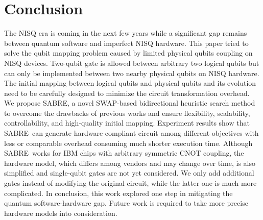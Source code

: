 \documentclass[journal,10pt,twocolumn]{IEEEtran}
\newcommand{\myalgorithmname}{SABRE}
\begin{document}
\section{Conclusion}\label{sec:conclusion}

The NISQ era is coming in the next few years while a significant gap remains between quantum software and imperfect NISQ hardware.
This paper tried to solve the qubit mapping problem caused by limited physical qubits coupling on NISQ devices.
Two-qubit gate is allowed between arbitrary two logical qubits but can only be implemented between two nearby physical qubits on NISQ hardware.
The initial mapping between logical qubits and physical qubits and its evolution need to be carefully designed to minimize the circuit transformation overhead. 
We propose \myalgorithmname, a novel SWAP-based bidirectional heuristic search method to overcome the drawbacks of previous works and ensure flexibility, scalability, controllability, and high-quality initial mapping. 
Experiment results show that \myalgorithmname~can generate hardware-compliant circuit among different objectives with less or comparable overhead consuming much shorter execution time.
Although \myalgorithmname~works for IBM chips with arbitrary symmetric CNOT coupling, the hardware model, which differs among vendors and may change over time, %
is also simplified and single-qubit gates are not yet considered. We only add additional gates instead of modifying the original circuit, while the latter one is much more complicated.
In conclusion, this work explored one step in mitigating the quantum software-hardware gap. Future work is required to take more precise hardware models into consideration.



%
%
\end{document}
